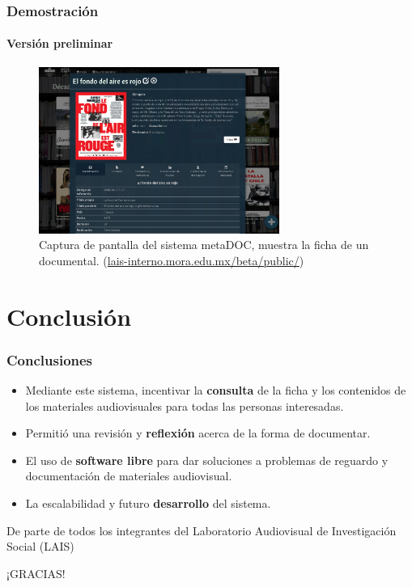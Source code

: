 \documentclass{beamer}
\begin{document}
\begin{frame}
	\frametitle{Demostración}
	\framesubtitle{Versión preliminar}
	
	\begin{figure}[H]
		\centering
		\includegraphics[width=0.7\textwidth]{Sistema01.jpg}
		\caption{Captura de pantalla del sistema metaDOC, muestra la ficha de un documental. (\url{lais-interno.mora.edu.mx/beta/public/})}
		\label{fig:sistema01}
	\end{figure}
\end{frame}


\section{Conclusión}
\begin{frame}
	\frametitle{Conclusiones}
	\begin{itemize}
		\item Mediante este sistema, incentivar la \textbf{consulta} de la ficha y los contenidos de los materiales audiovisuales para todas las personas interesadas.\pause
		\item Permitió una revisión y \textbf{reflexión} acerca de la forma de documentar.\pause
		\item El uso de \textbf{software libre} para dar soluciones a problemas de reguardo y documentación de materiales audiovisual.\pause
		\item La escalabilidad y futuro \textbf{desarrollo} del sistema.
	\end{itemize}
\end{frame}

\begin{frame}
	\begin{center}
		De parte de todos los integrantes del Laboratorio Audiovisual de Investigación Social (LAIS)
		
		¡GRACIAS!
		
	\end{center}
\end{frame}
\end{document}
